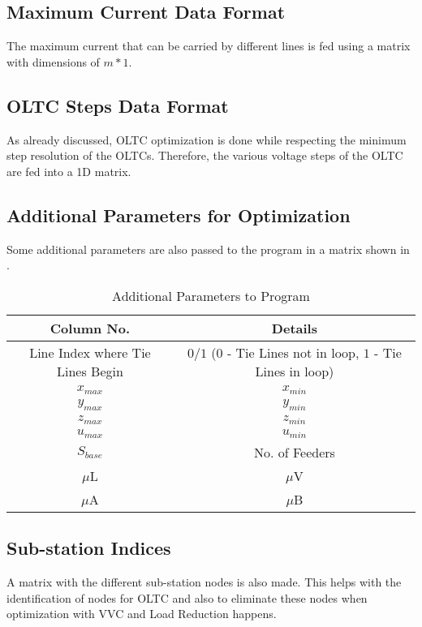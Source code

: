 \subsection*{Maximum Current Data Format}
The maximum current that can be carried by different lines is fed using a matrix with dimensions of $m*1$.

\subsection*{OLTC Steps Data Format}
As already discussed, OLTC optimization is done while respecting the minimum step resolution of the OLTCs. Therefore, the various voltage steps of the OLTC are fed into a 1D matrix.

\subsection*{Additional Parameters for Optimization}
Some additional parameters are also passed to the program in a matrix shown in .

\begin{table}[H]
\centering
\begin{tabular}{cc}
\rowcolor{gray!25}
\textbf{Column No.} & \textbf{Details}\\
\hline
Line Index where Tie Lines Begin & $0$/$1$ ($0$ - Tie Lines not in loop, $1$ - Tie Lines in loop)\\
\rowcolor{gray!15}
$x_{max}$ & $x_{min}$\\
$y_{max}$ & $y_{min}$\\
\rowcolor{gray!15}
$z_{max}$ & $z_{min}$\\
$u_{max}$ & $u_{min}$\\
\rowcolor{gray!15}
$S_{base}$ & No. of Feeders\\
$\mu$L & $\mu$V\\
\rowcolor{gray!15}
$\mu$A & $\mu$B\\
\hline
\end{tabular}
\caption{Additional Parameters to Program}
\end{table}

\subsection*{Sub-station Indices}
A matrix with the different sub-station nodes is also made. This helps with the identification of nodes for OLTC and also to eliminate these nodes when optimization with VVC and Load Reduction happens.

